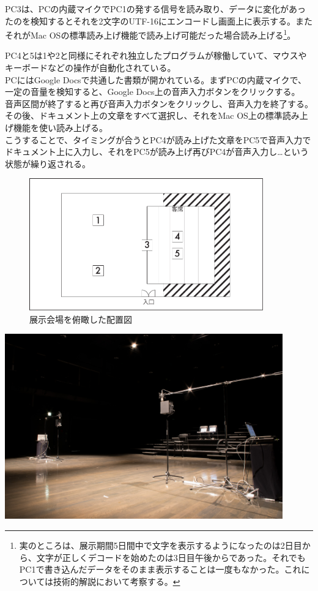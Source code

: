 \documentclass[a4paper,report]{jsbook}
\begin{document}
PC3は、PCの内蔵マイクでPC1の発する信号を読み取り、データに変化があったのを検知するとそれを2文字のUTF-16にエンコードし画面上に表示する。またそれがMac
OSの標準読み上げ機能で読み上げ可能だった場合読み上げる\footnote{実のところは、展示期間5日間中で文字を表示するようになったのは2日目から、文字が正しくデコードを始めたのは3日目午後からであった。それでもPC1で書き込んだデータをそのまま表示することは一度もなかった。これについては技術的解説において考察する。}。

PC4と5は1や2と同様にそれぞれ独立したプログラムが稼働していて、マウスやキーボードなどの操作が自動化されている。\\
PCにはGoogle
Docsで共通した書類が開かれている。まずPCの内蔵マイクで、一定の音量を検知すると、Google
Docs上の音声入力ボタンをクリックする。\\
音声区間が終了すると再び音声入力ボタンをクリックし、音声入力を終了する。その後、ドキュメント上の文章をすべて選択し、それをMac
OS上の標準読み上げ機能を使い読み上げる。\\
こうすることで、タイミングが合うとPC4が読み上げた文章をPC5で音声入力でドキュメント上に入力し、それをPC5が読み上げ再びPC4が音声入力し\ldots{}という状態が繰り返される。

\begin{figure}[htbp]
\centering
\includegraphics[width=0.90000\textwidth]{./img/place.pdf}
\caption{展示会場を俯瞰した配置図\label{fig:fukan}}
\end{figure}

\includegraphics[width=0.90000\textwidth]{./img/postpast1.jpg}~
\end{document}
